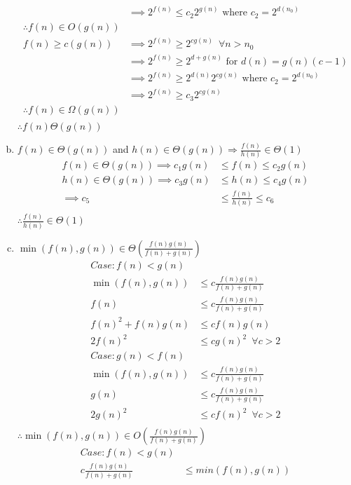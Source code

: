 \documentclass[12pt]{article}
\begin{document}
\begin{enumerate}[(a)]
\begin{align*}
&\implies 2^{f(n)} \leq c_{2}2^{g(n)} \text{ where } c_2 = 2^{d(n_0)}\\
\therefore f(n) \in O(g(n))&\\
f(n) \geq c(g(n))
&\implies 2^{f(n)} \geq 2^{cg(n)} \enspace \forall n > n_0\\
&\implies 2^{f(n)} \geq 2^{d+g(n)} \text { for } d(n) = g(n)(c-1)\\
&\implies 2^{f(n)} \geq 2^{d(n)}2^{cg(n)} \text{ where } c_2 = 2^{d(n_0)}\\
&\implies 2^{f(n)} \geq c_{3}2^{cg(n)}\\
\therefore f(n) \in \Omega (g(n))\\
\end{align*}
$\therefore f(n) \Theta (g(n))$\\
\item $f(n)\in \Theta(g(n))$ and 
         $h(n)\in \Theta(g(n)) \Rightarrow \frac{f(n)}{h(n)}\in \Theta(1)$ 
\begin{align*}
f(n)\in \Theta (g(n)) \implies c_{1}g(n) &\leq f(n) \leq c_{2}g(n)\\
h(n)\in \Theta (g(n)) \implies c_{3}g(n) &\leq h(n) \leq c_{4}g(n)\\
\implies c_{5} &\leq \frac{f(n)}{h(n)} \leq c_{6}\\
\end{align*}         
$\therefore \frac{f(n)}{h(n)}\in\Theta(1)$
\item $\min(f(n),g(n)) \in \Theta\left (\frac{f(n)g(n)}{f(n)+g(n)}\right)$  
\begin{align*}
Case: f(n) < g(n)\\
\min(f(n), g(n)) & \leq c \frac{f(n)g(n)}{f(n)+g(n)}\\
f(n) &\leq c\frac{f(n)g(n)}{f(n)+g(n)}\\
f(n)^2 + f(n)g(n) &\leq cf(n)g(n)\\
2f(n)^2 &\leq cg(n)^2 \enspace \forall c > 2\\
Case: g(n) < f(n)\\
\min(f(n), g(n)) & \leq c \frac{f(n)g(n)}{f(n)+g(n)}\\
g(n) & \leq c \frac{f(n)g(n)}{f(n)+g(n)}\\
2g(n)^2 &\leq cf(n)^2 \enspace \forall c>2\\
\end{align*}
$\therefore \min(f(n),g(n)) \in O\left (\frac{f(n)g(n)}{f(n)+g(n)}\right)$
\begin{align*}
Case: f(n) < g(n)\\
c \frac{f(n)g(n)}{f(n)+g(n)} &\leq min(f(n),g(n))\\

\end{align*}
\end{enumerate}
\end{document}

